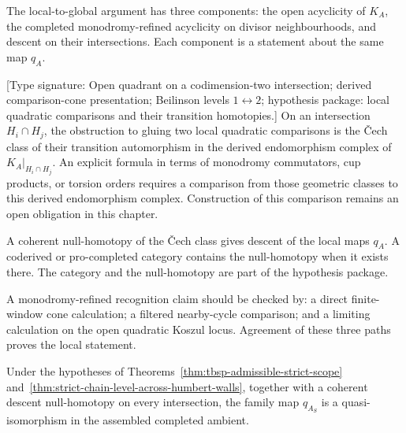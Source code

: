\begin{remark}
\label{rem:monodromy-refined-trichotomy}
The local-to-global argument has three components: the open acyclicity of
\(K_A\), the completed monodromy-refined acyclicity on divisor
neighbourhoods, and descent on their intersections.  Each component is a
statement about the same map \(q_A\).
\end{remark}

\begin{theorem}
\label{thm:wall-of-walls-obstruction}
\textup{[Type signature: Open quadrant on a codimension-two
intersection; derived comparison-cone presentation; Beilinson levels
\(1\leftrightarrow2\); hypothesis package: local quadratic
comparisons and their transition homotopies.]}
On an intersection \(H_i\cap H_j\), the obstruction to gluing two
local quadratic comparisons is the \v Cech class of their transition
automorphism in the derived endomorphism complex of
\(K_A|_{H_i\cap H_j}\).  An explicit formula in terms of monodromy
commutators, cup products, or torsion orders requires a comparison
from those geometric classes to this derived endomorphism complex.
Construction of this comparison remains an open obligation in this
chapter.
\end{theorem}

\begin{remark}
\label{rem:wall-of-walls-rescue}
A coherent null-homotopy of the \v Cech class gives descent of the
 local maps \(q_A\).  A coderived or pro-completed category contains
 the null-homotopy when it exists there.  The category and
the null-homotopy are part of the hypothesis package.
\end{remark}

\begin{remark}
\label{rem:three-checks-strict-humbert}
A monodromy-refined recognition claim should be checked by: a direct
finite-window cone calculation; a filtered nearby-cycle comparison;
and a limiting calculation on the open quadratic Koszul locus.
Agreement of these three paths proves the local statement.
\end{remark}

\begin{corollary}
\label{cor:sharpened-quadrichotomy-after-monodromy-refinement}
Under the hypotheses of
Theorems~\ref{thm:tbsp-admissible-strict-scope}
and~\ref{thm:strict-chain-level-across-humbert-walls}, together with a
coherent descent null-homotopy on every intersection, the family map
\(q_{A_S}\) is a quasi-isomorphism in the assembled completed ambient.
\end{corollary}

